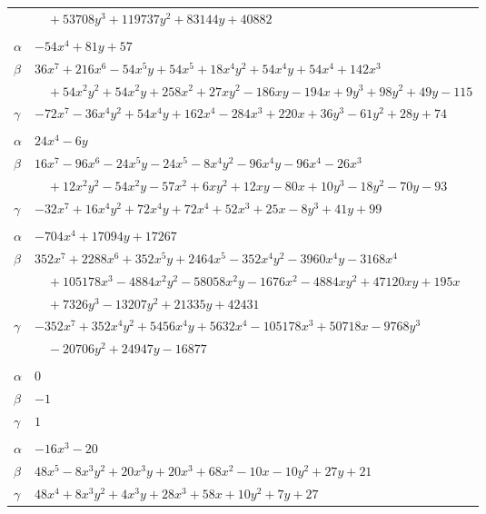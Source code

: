 \documentclass[11pt]{article}
\begin{document}
\begin{longtable}{@{}ll@{}}
 & $\quad +53708y^{3}+119737y^{2}+83144y+40882$\\
\addlinespace[3pt]
\multicolumn{2}{@{}l}{$\{i,j\}=\{42,95\}$, $k_{ij}=2^{3}\cdot 3$}\\
$\alpha$ & $-54x^{4}+81y+57$\\
$\beta$ & $36x^{7}+216x^{6}-54x^{5}y+54x^{5}+18x^{4}y^{2}+54x^{4}y+54x^{4}+142x^{3}$\\
 & $\quad +54x^{2}y^{2}+54x^{2}y+258x^{2}+27xy^{2}-186xy-194x+9y^{3}+98y^{2}+49y-115$\\
$\gamma$ & $-72x^{7}-36x^{4}y^{2}+54x^{4}y+162x^{4}-284x^{3}+220x+36y^{3}-61y^{2}+28y+74$\\
\addlinespace[3pt]
\multicolumn{2}{@{}l}{$\{i,j\}=\{42,98\}$, $k_{ij}=2^{6}\cdot 3$}\\
$\alpha$ & $24x^{4}-6y$\\
$\beta$ & $16x^{7}-96x^{6}-24x^{5}y-24x^{5}-8x^{4}y^{2}-96x^{4}y-96x^{4}-26x^{3}$\\
 & $\quad +12x^{2}y^{2}-54x^{2}y-57x^{2}+6xy^{2}+12xy-80x+10y^{3}-18y^{2}-70y-93$\\
$\gamma$ & $-32x^{7}+16x^{4}y^{2}+72x^{4}y+72x^{4}+52x^{3}+25x-8y^{3}+41y+99$\\
\addlinespace[3pt]
\multicolumn{2}{@{}l}{$\{i,j\}=\{43,55\}$, $k_{ij}=2\cdot 3\cdot 5\cdot 13$}\\
$\alpha$ & $-704x^{4}+17094y+17267$\\
$\beta$ & $352x^{7}+2288x^{6}+352x^{5}y+2464x^{5}-352x^{4}y^{2}-3960x^{4}y-3168x^{4}$\\
 & $\quad +105178x^{3}-4884x^{2}y^{2}-58058x^{2}y-1676x^{2}-4884xy^{2}+47120xy+195x$\\
 & $\quad +7326y^{3}-13207y^{2}+21335y+42431$\\
$\gamma$ & $-352x^{7}+352x^{4}y^{2}+5456x^{4}y+5632x^{4}-105178x^{3}+50718x-9768y^{3}$\\
 & $\quad -20706y^{2}+24947y-16877$\\
\addlinespace[3pt]
\multicolumn{2}{@{}l}{$\{i,j\}=\{43,77\}$, $k_{ij}=2$}\\
$\alpha$ & $0$\\
$\beta$ & $-1$\\
$\gamma$ & $1$\\
\addlinespace[3pt]
\multicolumn{2}{@{}l}{$\{i,j\}=\{43,80\}$, $k_{ij}=2\cdot 17$}\\
$\alpha$ & $-16x^{3}-20$\\
$\beta$ & $48x^{5}-8x^{3}y^{2}+20x^{3}y+20x^{3}+68x^{2}-10x-10y^{2}+27y+21$\\
$\gamma$ & $48x^{4}+8x^{3}y^{2}+4x^{3}y+28x^{3}+58x+10y^{2}+7y+27$\\

\end{longtable}
\end{document}
